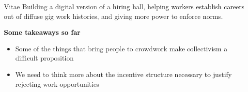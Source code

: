 \documentclass[../presentation]{subfiles}
\begin{document}
\begin{frame}[t]{Vitae}
  Building a digital version of a \alert{hiring hall}, helping workers establish \alert{careers} out of diffuse gig work histories, and giving more power to enforce norms.

    \large{\textbf{Some takeaways \alert{so far}}}
      \begin{itemize}
        \item<0,1,3> Some of the things that bring people to crowdwork make \alert{collectivism} a difficult proposition
        \item<0,2,3> We need to think more about the \alert{incentive structure} necessary to justify rejecting work opportunities
      \end{itemize}
\end{frame}
\end{document}
